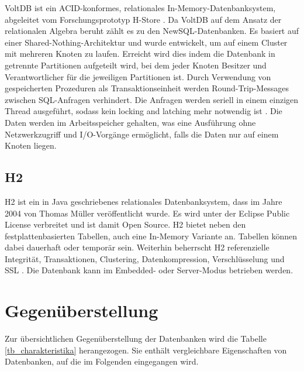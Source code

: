 VoltDB \cite{volt2013a} ist ein ACID-konformes, relationales In-Memory-Datenbanksystem, abgeleitet vom Forschungsprototyp H-Store \cite{kallman08}. Da VoltDB auf dem Ansatz der relationalen Algebra beruht zählt es zu den NewSQL-Datenbanken. Es basiert auf einer Shared-Nothing-Architektur und wurde entwickelt, um auf einem Cluster mit mehreren Knoten zu laufen. Erreicht wird dies indem die Datenbank in getrennte Partitionen aufgeteilt wird, bei dem jeder Knoten Besitzer und Verantwortlicher für die jeweiligen Partitionen ist. Durch Verwendung von gespeicherten Prozeduren als Transaktionseinheit werden Round-Trip-Messages zwischen SQL-Anfragen verhindert. Die Anfragen werden seriell in einem einzigen Thread ausgeführt, sodass kein locking and latching mehr notwendig ist \cite{volt2013b}. Die Daten werden im Arbeitsspeicher gehalten, was eine Ausführung ohne Netzwerkzugriff und I/O-Vorgänge ermöglicht, falls die Daten nur auf einem Knoten liegen.  

\subsection{H2} 
\label{ch:AnalyseDatenbanken:sec:Datenbanken:subsec:H2}

H2 ist ein in Java geschriebenes relationales Datenbanksystem, dass im Jahre 2004 von Thomas Müller veröffentlicht wurde. Es wird unter der Eclipse Public License verbreitet und ist damit Open Source. H2 bietet neben den festplattenbasierten Tabellen, auch eine In-Memory Variante an. Tabellen können dabei dauerhaft oder temporär sein. Weiterhin beherrscht H2 referenzielle Integrität, Transaktionen, Clustering, Datenkompression, Verschlüsselung und SSL \cite{h2:2013}. Die Datenbank kann im Embedded- oder Server-Modus betrieben werden.

\section{Gegenüberstellung} 
\label{ch:AnalyseDatenbanken:sec:Gegenüberstellung}

Zur übersichtlichen Gegenüberstellung der Datenbanken wird die Tabelle \ref{tb_charakteristika} herangezogen. Sie enthält vergleichbare Eigenschaften von Datenbanken, auf die im Folgenden eingegangen wird. 

